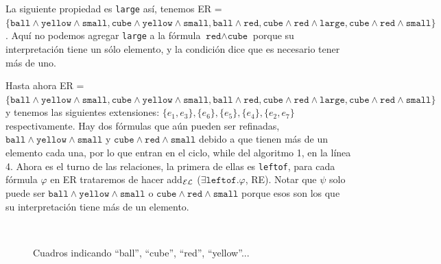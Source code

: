La siguiente propiedad es \texttt{large} as\'i, tenemos ER = $\{\texttt{ball} \wedge \texttt{yellow} \wedge \texttt{small}, \texttt{cube} \wedge \texttt{yellow} \wedge \texttt{small}, \texttt{ball} \wedge \texttt{red}, \texttt{cube} \wedge \texttt{red} \wedge \texttt{large}, \texttt{cube} \wedge \texttt{red} \wedge \texttt{small}\}$. Aqu\'i no podemos agregar \texttt{large} a la f\'ormula $\texttt{red} \wedge \texttt{cube}$ porque su interpretaci\'on tiene un s\'olo elemento, y la condici\'on dice que es necesario tener m\'as de uno.

Hasta ahora ER = $\{\texttt{ball} \wedge \texttt{yellow} \wedge \texttt{small}, \texttt{cube} \wedge \texttt{yellow} \wedge \texttt{small}, \texttt{ball} \wedge \texttt{red}, \texttt{cube} \wedge \texttt{red} \wedge \texttt{large}, \texttt{cube} \wedge \texttt{red} \wedge \texttt{small}\}$ 
y tenemos las siguientes extensiones: $\{e_1, e_3\}, \{e_6\}, \{e_5\}, \{e_4\}, \{e_2, e_7\}$ respectivamente. 
Hay dos f\'ormulas que a\'un pueden ser refinadas, $\texttt{ball} \wedge \texttt{yellow} \wedge \texttt{small}$ y $\texttt{cube} \wedge \texttt{red} \wedge \texttt{small}$ 
debido a que tienen m\'as de un elemento cada una, por lo que entran en el ciclo, while del algoritmo 1, en la l\'inea 4. Ahora es el turno de las relaciones, la primera de ellas es \texttt{leftof}, para cada f\'ormula $\varphi$ en ER trataremos de hacer add$_\mathcal{EL}$ ($\exists \texttt{leftof}.\varphi$, RE). Notar que $\psi$ solo puede ser $\texttt{ball} \wedge \texttt{yellow} \wedge \texttt{small}$ o $\texttt{cube} \wedge \texttt{red} \wedge \texttt{small}$ porque esos son los que su interpretaci\'on tiene m\'as de un elemento. 


\begin{figure}[ht]
\begin{center}
\\[0pt]
\caption{Cuadros indicando ``ball'', ``cube'', ``red'', ``yellow''...}
\label{fig-modelo15}
\end{center}
\end{figure}


